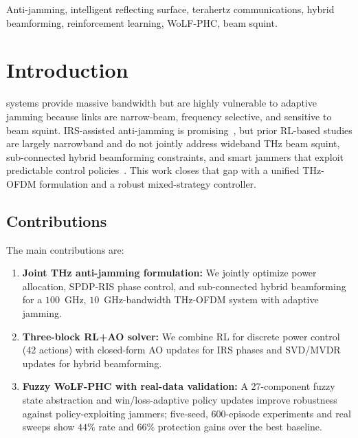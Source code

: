 \documentclass[journal,twocolumn]{IEEEtran}
\begin{document}
\begin{IEEEkeywords}
Anti-jamming, intelligent reflecting surface, terahertz communications, hybrid beamforming, reinforcement learning, WoLF-PHC, beam squint.
\end{IEEEkeywords}

\section{Introduction}
\label{sec:intro}

 systems provide massive bandwidth but are highly vulnerable to adaptive jamming because links are narrow-beam, frequency selective, and sensitive to beam squint. IRS-assisted anti-jamming is promising~\cite{wu2019intelligent,wu2021irs_survey,renzo2020smart}, but prior RL-based studies are largely narrowband and do not jointly address wideband THz beam squint, sub-connected hybrid beamforming constraints, and smart jammers that exploit predictable control policies~\cite{yang2021irs,su2023wideband,yan2023beamforming}. This work closes that gap with a unified THz-OFDM formulation and a robust mixed-strategy controller.

\subsection{Contributions}

The main contributions are:

\begin{enumerate}
\item \textbf{Joint THz anti-jamming formulation:} We jointly optimize power allocation, SPDP-RIS phase control, and sub-connected hybrid beamforming for a $100$~GHz, $10$~GHz-bandwidth THz-OFDM system with adaptive jamming.
\item \textbf{Three-block RL+AO solver:} We combine RL for discrete power control (42 actions) with closed-form AO updates for IRS phases and SVD/MVDR updates for hybrid beamforming.
\item \textbf{Fuzzy WoLF-PHC with real-data validation:} A 27-component fuzzy state abstraction and win/loss-adaptive policy updates improve robustness against policy-exploiting jammers; five-seed, 600-episode experiments and real sweeps show $44\%$ rate and $66\%$ protection gains over the best baseline.
\end{enumerate}
\end{document}
